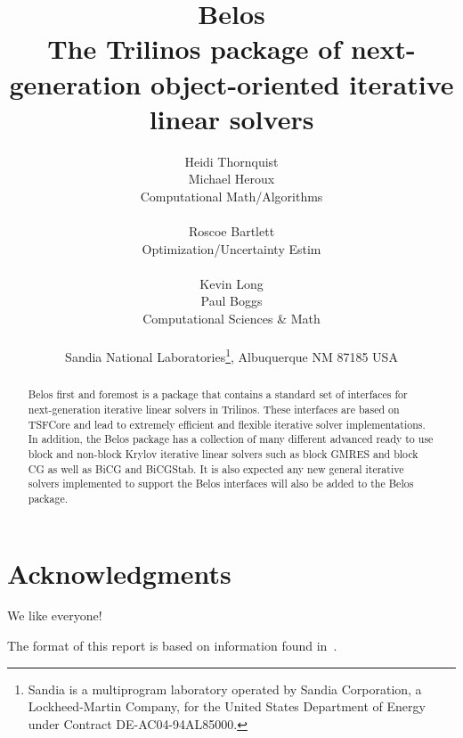 \documentclass[pdf,ps2pdf,11pt]{SANDreport}
\title{
{\Huge\bf Belos}\\[1.5ex] The Trilinos package of next-generation
object-oriented iterative linear solvers }
\author{
Heidi Thornquist \\
Michael Heroux \\
Computational Math/Algorithms \\ \\
Roscoe Bartlett \\
Optimization/Uncertainty Estim \\ \\
Kevin Long \\
Paul Boggs \\
Computational Sciences \& Math \\ \\
Sandia National Laboratories\footnote{
Sandia is a multiprogram laboratory operated by Sandia Corporation, a
Lockheed-Martin Company, for the United States Department of Energy
under Contract DE-AC04-94AL85000.}, Albuquerque NM 87185 USA
}
\date{}
\begin{document}
\maketitle

%

%
\begin{abstract}
%
Belos first and foremost is a package that contains a standard set of
interfaces for next-generation iterative linear solvers in Trilinos.
These interfaces are based on TSFCore and lead to extremely efficient
and flexible iterative solver implementations.  In addition, the Belos
package has a collection of many different advanced ready to use block
and non-block Krylov iterative linear solvers such as block GMRES and
block CG as well as BiCG and BiCGStab.  It is also expected any new
general iterative solvers implemented to support the Belos interfaces
will also be added to the Belos package.
%
\end{abstract}
%

%
\clearpage
\section*{Acknowledgments}
We like everyone!

The format of this report is based on information found
in~\cite{Sand98-0730}.

%
\clearpage
\tableofcontents
\listoffigures

\end{document}
